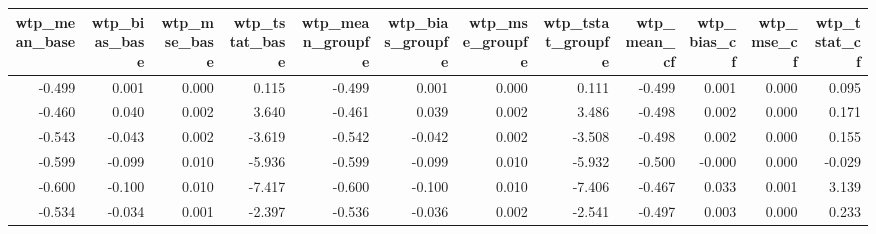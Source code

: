 \begin{tabular}{rrrrrrrrrrrr}
  \hline
wtp\_mean\_base & wtp\_bias\_base & wtp\_mse\_base & wtp\_tstat\_base & wtp\_mean\_groupfe & wtp\_bias\_groupfe & wtp\_mse\_groupfe & wtp\_tstat\_groupfe & wtp\_mean\_cf & wtp\_bias\_cf & wtp\_mse\_cf & wtp\_tstat\_cf \\ 
  \hline
-0.499 & 0.001 & 0.000 & 0.115 & -0.499 & 0.001 & 0.000 & 0.111 & -0.499 & 0.001 & 0.000 & 0.095 \\ 
  -0.460 & 0.040 & 0.002 & 3.640 & -0.461 & 0.039 & 0.002 & 3.486 & -0.498 & 0.002 & 0.000 & 0.171 \\ 
  -0.543 & -0.043 & 0.002 & -3.619 & -0.542 & -0.042 & 0.002 & -3.508 & -0.498 & 0.002 & 0.000 & 0.155 \\ 
  -0.599 & -0.099 & 0.010 & -5.936 & -0.599 & -0.099 & 0.010 & -5.932 & -0.500 & -0.000 & 0.000 & -0.029 \\ 
  -0.600 & -0.100 & 0.010 & -7.417 & -0.600 & -0.100 & 0.010 & -7.406 & -0.467 & 0.033 & 0.001 & 3.139 \\ 
  -0.534 & -0.034 & 0.001 & -2.397 & -0.536 & -0.036 & 0.002 & -2.541 & -0.497 & 0.003 & 0.000 & 0.233 \\ 
   \hline
\end{tabular}

